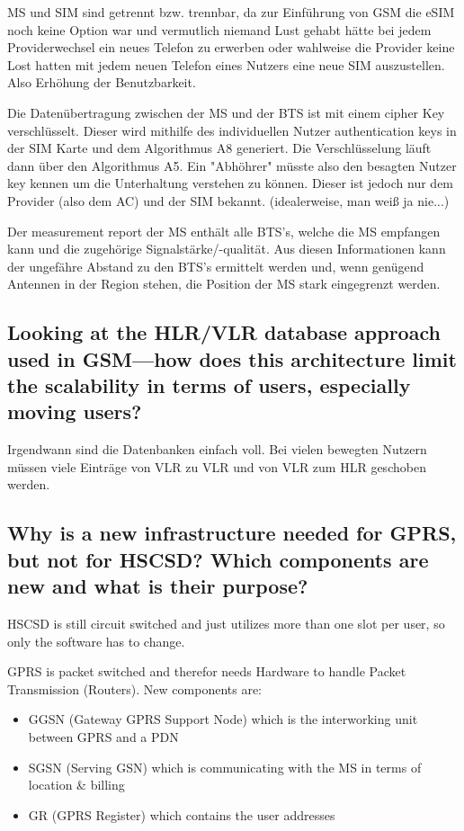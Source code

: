 MS und SIM sind getrennt bzw. trennbar, da zur Einführung von GSM die eSIM noch keine Option war und vermutlich niemand Lust gehabt hätte bei jedem Providerwechsel ein neues Telefon zu erwerben oder wahlweise die Provider keine Lost hatten mit jedem neuen Telefon eines Nutzers eine neue SIM auszustellen. Also Erhöhung der Benutzbarkeit.


Die Datenübertragung zwischen der MS und der BTS ist mit einem cipher Key verschlüsselt. Dieser wird mithilfe des individuellen Nutzer authentication keys in der SIM Karte und dem Algorithmus A8 generiert. Die Verschlüsselung läuft dann über den Algorithmus A5. Ein "Abhöhrer" müsste also den besagten Nutzer key kennen um die Unterhaltung verstehen zu können. Dieser ist jedoch nur dem Provider (also dem AC) und der SIM bekannt. (idealerweise, man weiß ja nie...)

Der measurement report der MS enthält alle BTS's, welche die MS empfangen kann und die zugehörige Signalstärke/-qualität. Aus diesen Informationen kann der ungefähre Abstand zu den BTS's ermittelt werden und, wenn genügend Antennen in der Region stehen, die Position der MS stark eingegrenzt werden.



\subsection{Looking at the HLR/VLR database approach used in GSM—how does this architecture limit the scalability in terms of users, especially moving users?}

Irgendwann sind die Datenbanken einfach voll. 
Bei vielen bewegten Nutzern müssen viele Einträge von VLR zu VLR und von VLR zum HLR geschoben werden.

\subsection{Why is a new infrastructure needed for GPRS, but not for HSCSD? Which components are new and what is their purpose?}

HSCSD is still circuit switched and just utilizes more than one slot per user, so only the software has to change. 

GPRS is packet switched and therefor needs Hardware to handle Packet Transmission (Routers).
New components are:
\begin{itemize}

\item GGSN (Gateway GPRS Support Node) which is the interworking unit between GPRS and a PDN

\item SGSN (Serving GSN) which is communicating with the MS in terms of location & billing

\item GR (GPRS Register) which contains the user addresses
\end{itemize}

